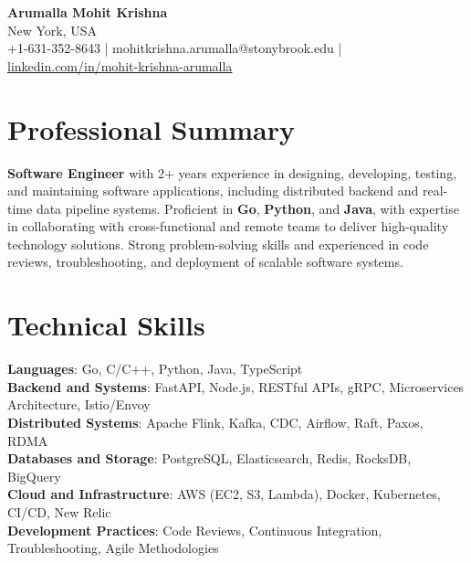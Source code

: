 \documentclass[letterpaper,11pt]{article}
\begin{document}
\begin{center}
  {\Large \textbf{Arumalla Mohit Krishna}} \\
  New York, USA \\
  +1-631-352-8643 \enspace | \enspace mohitkrishna.arumalla@stonybrook.edu \enspace | \enspace \href{https://www.linkedin.com/in/mohit-krishna-arumalla}{linkedin.com/in/mohit-krishna-arumalla}
\end{center}

\section{Professional Summary}
  \begin{itemize}[leftmargin=0.15in, label={}]
    \small{\item{
     \textbf{Software Engineer} with 2+ years experience in designing, developing, testing, and maintaining software applications, including distributed backend and real-time data pipeline systems. Proficient in \textbf{Go}, \textbf{Python}, and \textbf{Java}, with expertise in collaborating with cross-functional and remote teams to deliver high-quality technology solutions. Strong problem-solving skills and experienced in code reviews, troubleshooting, and deployment of scalable software systems.
    }}
  \end{itemize}
\vspace{-16pt}

\section{Technical Skills}
 \begin{itemize}[leftmargin=0.15in, label={}]
    \small{\item{
     \textbf{Languages}: Go, C/C++, Python, Java, TypeScript \\
     \textbf{Backend and Systems}: FastAPI, Node.js, RESTful APIs, gRPC, Microservices Architecture, Istio/Envoy \\
     \textbf{Distributed Systems}: Apache Flink, Kafka, CDC, Airflow, Raft, Paxos, RDMA \\
     \textbf{Databases and Storage}: PostgreSQL, Elasticsearch, Redis, RocksDB, BigQuery \\
     \textbf{Cloud and Infrastructure}: AWS (EC2, S3, Lambda), Docker, Kubernetes, CI/CD, New Relic \\
     \textbf{Development Practices}: Code Reviews, Continuous Integration, Troubleshooting, Agile Methodologies
    }}
 \end{itemize}
\vspace{-16pt}
\end{document}
